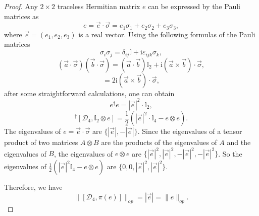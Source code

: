 \documentclass[a4paper,12pt]{article}
\begin{document}
\begin{proof}
	Any $2 \times 2$ traceless Hermitian matrix $e$ can be
expressed by the Pauli matrices as
\begin{equation}
	e = \vec{e} \cdot \vec{\sigma} = e_1 \sigma_1 + e_2 \sigma_2 + e_3 \sigma_3,
\end{equation}
where $\vec{e} = (e_1, e_2, e_3)$ is a real vector.
Using the following formulas of the Pauli matrices
\begin{equation}
	\sigma_i \sigma_j = \delta_{i j} \mathbb{I}+ \text{i} \varepsilon_{i j k}
	\sigma_k,
\end{equation}
\begin{equation}
	(\vec{a} \cdot \vec{\sigma})  (\vec{b} \cdot \vec{\sigma}) = (\vec{a} \cdot
	\vec{b}) \mathbb{I}_2 + \text{i}  (\vec{a} \times \vec{b}) \cdot
	\vec{\sigma},
\end{equation}
\begin{equation}
	[\vec{a} \cdot \vec{\sigma}, \vec{b} \cdot \vec{\sigma}] = 2 \text{i}
	(\vec{a} \times \vec{b}) \cdot \vec{\sigma},
\end{equation}
after some straightforward calculations, one can obtain
\begin{equation}
	e^{\dag} e = | \vec{e}  |^2 \cdot \mathbb{I}_2,
\end{equation}
\begin{equation}
	[\mathcal{D}_4, \mathbb{I}_2 \otimes e]^{\dag} [\mathcal{D}_4, \mathbb{I}_2
	\otimes e] = \frac{1}{2} (| \vec{e}  |^2 \cdot \mathbb{I}_4 - e \otimes e).
\end{equation}
The eigenvalues of $e = \vec{e} \cdot \vec{\sigma}$ are $\{ | \vec{e} |,- | \vec{e} | \}$.
Since the eigenvalues of a tensor product of two matrices $A \otimes B$ are the
products of the eigenvalues of $A$ and the eigenvalues of $B$, the eigenvalues of $e \otimes e$ are $\{| \vec{e} |^2, | \vec{e} |^2, - | \vec{e} |^2,
- | \vec{e} |^2 \}$.
So the eigenvalues of $\frac{1}{2}  (| \vec{e} |^2 \mathbb{I}_4 - e \otimes e)$
are $\{0, 0, | \vec{e} |^2, | \vec{e} |^2 \}$.


Therefore, we have
\begin{equation}
  \|[\mathcal{D}_4, \pi (e)]\|_{op} = | \vec{e} | = \|e\|_{op} .
\end{equation}
\end{proof}
\end{document}
